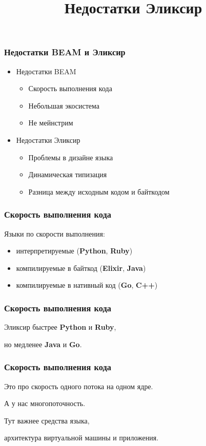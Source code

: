 \documentclass[10pt]{beamer}
\title{Недостатки Эликсир}
\begin{document}
\begin{frame}
  \frametitle{Недостатки BEAM и Эликсир}
  \begin{itemize}
  \item Недостатки BEAM
    \begin{itemize}
    \item Скорость выполнения кода
    \item Небольшая экосистема
    \item Не мейнстрим
    \end{itemize}
  \item Недостатки Эликсир
    \begin{itemize}
    \item Проблемы в дизайне языка
    \item Динамическая типизация
    \item Разница между исходным кодом и байткодом
    \end{itemize}
  \end{itemize}
\end{frame}

\begin{frame}
  \frametitle{Скорость выполнения кода}
  Языки по скорости выполнения:
  \begin{itemize}
  \item интерпретируемые (\textbf{Python}, \textbf{Ruby})
  \item компилируемые в байткод (\textbf{Elixir}, \textbf{Java})
  \item компилируемые в нативный код (\textbf{Go}, \textbf{C++})
  \end{itemize}
\end{frame}

\begin{frame}
  \frametitle{Скорость выполнения кода}
  Эликсир быстрее \textbf{Python} и \textbf{Ruby},
  \par \bigskip
  но медленее \textbf{Java} и \textbf{Go}.
\end{frame}

\begin{frame}
  \frametitle{Скорость выполнения кода}
  Это про скорость одного потока на одном ядре.
  \par \bigskip
  А у нас многопоточность.
  \par \bigskip
  Тут важнее средства языка,
  \par \bigskip
  архитектура виртуальной машины и приложения.
\end{frame}
\end{document}
